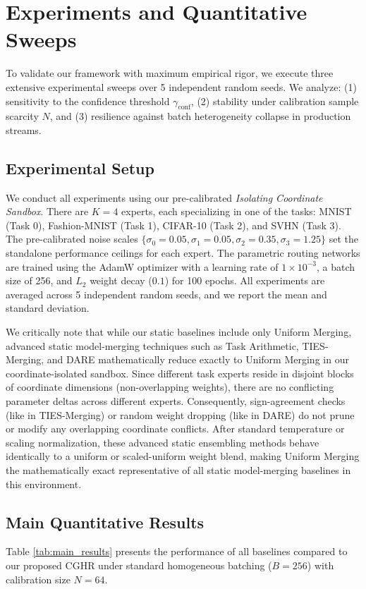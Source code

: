 \section{Experiments and Quantitative Sweeps}
\label{sec:experiments}

To validate our framework with maximum empirical rigor, we execute three extensive experimental sweeps over 5 independent random seeds. We analyze: (1) sensitivity to the confidence threshold $\gamma_{\text{conf}}$, (2) stability under calibration sample scarcity $N$, and (3) resilience against batch heterogeneity collapse in production streams.

\subsection{Experimental Setup}
We conduct all experiments using our pre-calibrated \emph{Isolating Coordinate Sandbox}. There are $K=4$ experts, each specializing in one of the tasks: MNIST (Task 0), Fashion-MNIST (Task 1), CIFAR-10 (Task 2), and SVHN (Task 3). The pre-calibrated noise scales $\{\sigma_0=0.05, \sigma_1=0.05, \sigma_2=0.35, \sigma_3=1.25\}$ set the standalone performance ceilings for each expert.
The parametric routing networks are trained using the AdamW optimizer with a learning rate of $1\times 10^{-3}$, a batch size of 256, and $L_2$ weight decay ($0.1$) for 100 epochs. All experiments are averaged across 5 independent random seeds, and we report the mean and standard deviation.

We critically note that while our static baselines include only Uniform Merging, advanced static model-merging techniques such as Task Arithmetic, TIES-Merging, and DARE mathematically reduce exactly to Uniform Merging in our coordinate-isolated sandbox. Since different task experts reside in disjoint blocks of coordinate dimensions (non-overlapping weights), there are no conflicting parameter deltas across different experts. Consequently, sign-agreement checks (like in TIES-Merging) or random weight dropping (like in DARE) do not prune or modify any overlapping coordinate conflicts. After standard temperature or scaling normalization, these advanced static ensembling methods behave identically to a uniform or scaled-uniform weight blend, making Uniform Merging the mathematically exact representative of all static model-merging baselines in this environment.

\subsection{Main Quantitative Results}
Table \ref{tab:main_results} presents the performance of all baselines compared to our proposed CGHR under standard homogeneous batching ($B=256$) with calibration size $N=64$.

